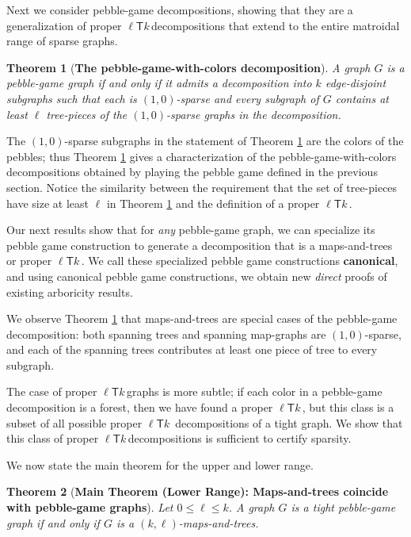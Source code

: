 \documentclass[Svgc,nospthms]{Svgc}
\newcommand{\ellteekay}{\ensuremath{\ell{\mathsf T}k}\,}
\newtheorem{theorem}{Theorem}
\newcommand{\refthm}[1]{Theorem \ref{thm.#1}}
\newcommand{\labelthm}[1]{\label{thm.#1}}
\begin{document}
Next we consider pebble-game decompositions, showing that they are a generalization of 
proper \ellteekay decompositions that extend to the entire matroidal range of sparse
graphs.

\begin{theorem}[{\bf The pebble-game-with-colors decomposition}] \labelthm{non-canonical-decomposition}
	A graph $G$ is a pebble-game graph if and only if it admits a decomposition into $k$	
	edge-disjoint subgraphs such that each  is $(1,0)$-sparse and every subgraph of $G$ 
	contains at least $\ell$  tree-pieces of the $(1,0)$-sparse graphs in the decomposition.
\end{theorem}

The $(1,0)$-sparse subgraphs in the statement of \refthm{non-canonical-decomposition} 
are the colors of the pebbles; thus \refthm{non-canonical-decomposition}
gives a characterization of the pebble-game-with-colors decompositions 
obtained by playing the pebble game defined in the previous section.  
Notice the similarity between the 
requirement that the set of tree-pieces have size at least $\ell$ in 
\refthm{non-canonical-decomposition} and the definition of a proper $\ellteekay$.

Our next
results show that for {\it any} pebble-game graph, we can specialize its pebble game
construction to generate a decomposition that is a maps-and-trees or proper \ellteekay.
We call these specialized pebble game constructions {\bf canonical}, and using 
canonical pebble game constructions, we obtain new {\it direct} proofs of 
existing arboricity results.

We observe \refthm{non-canonical-decomposition}	that maps-and-trees 
 are special cases of the pebble-game decomposition: both spanning trees and 
spanning map-graphs are $(1,0)$-sparse, and each of the 
spanning trees contributes at least one piece of tree to every subgraph.

The case of proper \ellteekay graphs is more subtle; if each color in a 
pebble-game decomposition is a forest, then we have found a proper
\ellteekay, but this class is a subset of all possible proper \ellteekay
decompositions of a tight graph.  We show that this class of proper 
\ellteekay decompositions is sufficient to certify sparsity.

We now state the main theorem for the upper and lower range.

\begin{theorem}[{\bf Main Theorem (Lower Range): Maps-and-trees coincide with pebble-game graphs}]
	\labelthm{canonical-decomposition-I} Let $0\le \ell\le k$. A graph $G$ is a tight pebble-game graph if and only if $G$ is a $(k,\ell)$-maps-and-trees. 
\end{theorem}
\end{document}
